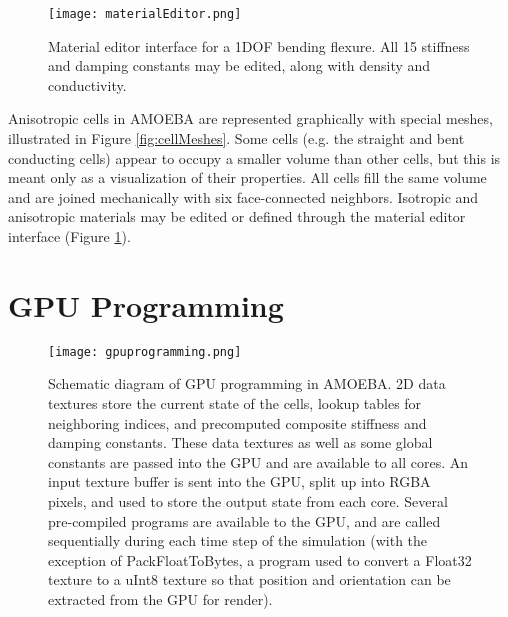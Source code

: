 {\begin{figure}
  \texttt{[image: materialEditor.png]}
  \caption{Material editor interface for a 1DOF bending flexure.  All 15 stiffness and damping constants may be edited, along with density and conductivity.}
  \label{fig:materialEditor}
\end{figure}

Anisotropic cells in AMOEBA are represented graphically with special meshes, illustrated in Figure \ref{fig:cellMeshes}.  Some cells (e.g. the straight and bent conducting cells) appear to occupy a smaller volume than other cells, but this is meant only as a visualization of their properties.  All cells fill the same volume and are joined mechanically with six face-connected neighbors.  Isotropic and anisotropic materials may be edited or defined through the material editor interface (Figure \ref{fig:materialEditor}).\\

\section{GPU Programming}


\begin{figure}
  \texttt{[image: gpuprogramming.png]}
  \caption{Schematic diagram of GPU programming in AMOEBA.  2D data textures store the current state of the cells, lookup tables for neighboring indices, and precomputed composite stiffness and damping constants.  These data textures as well as some global constants are passed into the GPU and are available to all cores.  An input texture buffer is sent into the GPU, split up into RGBA pixels, and used to store the output state from each core.  Several pre-compiled programs are available to the GPU, and are called sequentially during each time step of the simulation (with the exception of PackFloatToBytes, a program used to convert a Float32 texture to a uInt8 texture so that position and orientation can be extracted from the GPU for render).}
  \label{fig:gpuprogramming}
\end{figure}

}
